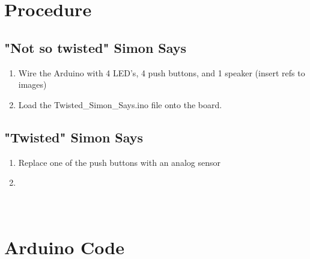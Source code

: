 \documentclass[12pt,letterpaper,oneside]{article}
\begin{document}
\section{Procedure}
		
		\subsection{"Not so twisted" Simon Says}
			\begin{enumerate}
				\item Wire the Arduino with 4 LED's, 4 push buttons, and 1 speaker (insert refs to images)
				\item Load the Twisted\_Simon\_Says.ino file onto the board.
			\end{enumerate}
								
		\subsection{"Twisted" Simon Says}
			\begin{enumerate}
				\item Replace one of the push buttons with an analog sensor
				\item 
			\end{enumerate}
		


\newpage
\appendix
\section{\\Arduino Code} \label{App:AppendixA}

	
\newpage		
\printbibliography
\end{document}
